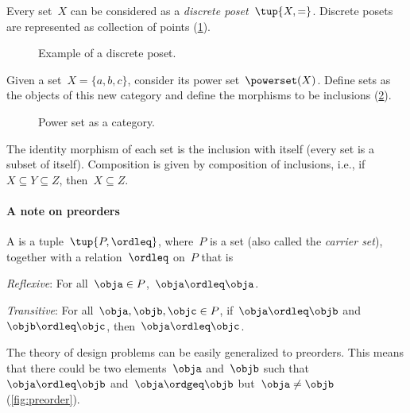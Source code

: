 \begin{example}
    \label{ex:discreteposet}
    Every set~$X$ can be considered as a \emph{discrete poset}~$\tup{X,=}$. Discrete posets are represented as collection of points (\cref{fig:discretepos}).

    \begin{figure}[tbh]
        \centering
        \caption{Example of a discrete poset. \label{fig:discretepos}}
    \end{figure}

    \begin{example}
        \label{ex:hasseinclusion}
        Given a set~$X=\{a,b,c\}$, consider its power set~$\powerset(X)$. Define sets as the objects of this new category and define the morphisms to be inclusions (\cref{fig:powersetcat}).

        \begin{figure}[h!]
            \begin{center}
            \end{center}
            \caption{Power set as a category.}
            \label{fig:powersetcat}
        \end{figure}

        The identity morphism of each set is the inclusion with itself (every set is a subset of itself). Composition is given by composition of inclusions, i.e., if~$X\subseteq Y \subseteq Z$, then~$X\subseteq Z$.
    \end{example}
\end{example}

\paragraph{A note on preorders}
\begin{definition}[Preorder]
    \label{def:preorder}
    A \emph{} is a tuple~$\tup{P, \ordleq}$,
    where~$P$ is a set (also called the \emph{carrier set}), together with a
    relation~$\ordleq$ on~$P$ that is
    \begin{compactenum}
        \item \emph{Reflexive}: For all~$\obja\in P$,~$\obja\ordleq \obja$.
        \item \emph{Transitive}: For all~$\obja,\objb,\objc\in P$, if~$\obja\ordleq \objb$ and~$\objb\ordleq \objc$, then~$\obja\ordleq \objc$.
    \end{compactenum}
\end{definition}
The theory of design problems can be easily generalized to preorders. This means that there could be two elements~$\obja$ and~$\objb$ such that~$\obja\ordleq \objb$ and~$\obja \ordgeq \objb$ but~$\obja \neq \objb$ (\cref{fig:preorder}).


